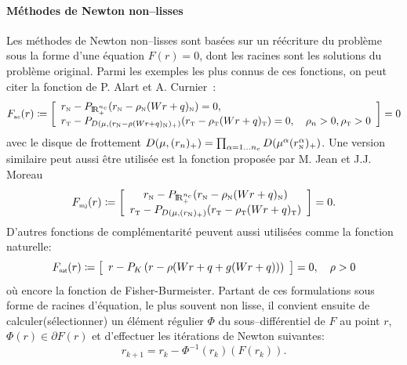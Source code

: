 \documentclass{CSMA2017}
\def\RR{\nbR}
\def\nbR{\ensuremath{\mathrm{I\!R}}} %
\def\n{{\hbox{\tiny{N}}}}
\def\t{{\hbox{\tiny{T}}}}
\def\nat{{\hbox{\sf \tiny{nat}}}}
\def\ac{{\hbox{\tiny{ac}}}}
\def\mjtwo{{\hbox{\tiny{mj}}}}
\begin{document}
\paragraph{Méthodes de Newton non--lisses} Les méthodes  de Newton non--lisses sont basées sur un réécriture du problème sous la forme d'une équation $F(r)=0$, dont les racines sont les solutions du problème original. Parmi les exemples les plus connus de ces fonctions, on peut citer la fonction de P. Alart et A. Curnier~\cite{Alart.Curnier1991}:
\begin{equation}
  \label{eq:AC-1}
 F_\ac(r) \coloneqq  
  \left[
  \begin{array}{l} 
    r_\n - P_{\RR^{n_c}_+}(r_\n - \rho_\n  (Wr+q)_\n) = 0, \\
    r_\t - P_{D(\mu, (r_\n - \rho (Wr+q)_\n)_+)}(r_\t - \rho_\t (Wr+q)_\t   )=0,\quad \rho_n>0, \rho_\t>0
  \end{array}
  \right] =0
\end{equation}
avec le disque de frottement  $D(\mu,(r_{n})_+) = \prod_{\alpha=1\ldots n_c} D(\mu^{\alpha} (r_{\n}^\alpha)_+)$. Une version similaire peut aussi être utilisée est la fonction proposée par M. Jean et J.J. Moreau~\cite{Jean.Moreau1987}
\begin{equation}
  \label{eq:MJ-II}
    F_{\mjtwo}(r) \coloneqq \left[ \begin{array}{c}
    r_\n - P_{\RR^{n_c}_+}(r_\n - \rho_\n (W r +  q)_\n) \\
    r_\t - P_{D(\mu, (r_{\n})_+)}(r_\t - \rho_\t (Wr+q)_\t   ) 
  \end{array}\right] =0.
\end{equation}
 D'autres fonctions de complémentarité peuvent aussi utilisées comme la fonction naturelle:
\begin{equation}
  \label{eq:natural-II}
  F_\nat(r) \coloneqq   \left[
  \begin{array}{l} 
    r - P_{K}\left(r  - \rho (Wr+q + g(Wr+q))\right)
  \end{array}\right] 
  = 0, \quad \rho >0
\end{equation}
où encore la fonction de Fisher-Burmeister. Partant de ces formulations sous forme de racines d'équation, le plus souvent non lisse, il convient ensuite de calculer(sélectionner) un élément régulier $\Phi$ du sous--différentiel de $F$ au point $r$, $\Phi(r) \in \partial F(r)$ et d'effectuer les itérations de Newton suivantes:
\begin{equation}
  \label{eq:NSN3}
  r_{k+1}  =  r_k -  \Phi^{-1}(r_k) (F(r_k)).
\end{equation}
\end{document}
